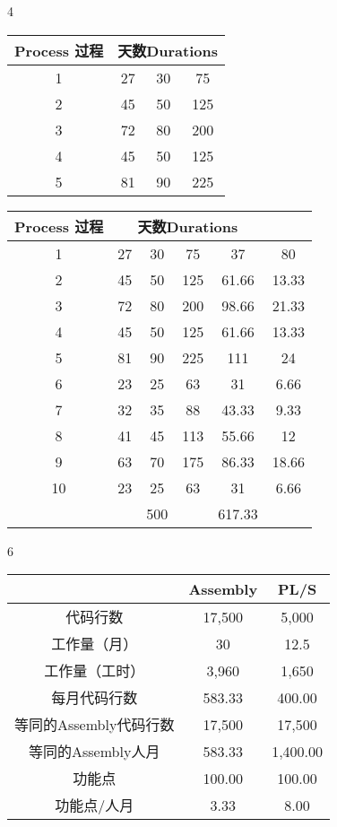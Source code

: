 \documentclass{book}        %
\begin{document}
4


\begin{tabular}{|c|c|c|c|}
\hline
Process 过程&\multicolumn{3}{c|}{天数Durations}\\
\hline
1&27&30&75\\
\hline
2&45&50&125\\
\hline
3&72&80&200\\
\hline
4&45&50&125\\
\hline
5&81&90&225\\
\hline
\end{tabular}

\begin{tabular}{|c|c|c|c|c|c|}
\hline
Process 过程&\multicolumn{4}{c|}{天数Durations}\\
\hline
1&27&30&75&37&80\\
\hline
2&45&50&125&61.66&13.33\\
\hline
3&72&80&200&98.66&21.33\\
\hline
4&45&50&125&61.66&13.33\\
\hline
5&81&90&225&111&24\\
\hline
6&23&25&63&31&6.66\\
\hline
7&32&35&88&43.33&9.33\\
\hline
8&41&45&113&55.66&12\\
\hline
9&63&70&175&86.33&18.66\\
\hline
10&23&25&63&31&6.66\\
\hline
\:&\:&500&\:&617.33&\: \\
\hline
\end{tabular}

6

\begin{tabular}{|c|c|c|}
\hline
\:&Assembly&PL/S\\
\hline
代码行数&17,500&5,000\\
\hline
工作量（月）&30&12.5\\
\hline
工作量（工时）&3,960&1,650\\
\hline
每月代码行数&583.33&400.00 \\
\hline
等同的Assembly代码行数&17,500&17,500\\
\hline
等同的Assembly人月&583.33&1,400.00\\
\hline
功能点&100.00&100.00\\
\hline
功能点/人月&3.33&8.00\\
\hline
\end{tabular}
\end{document}
